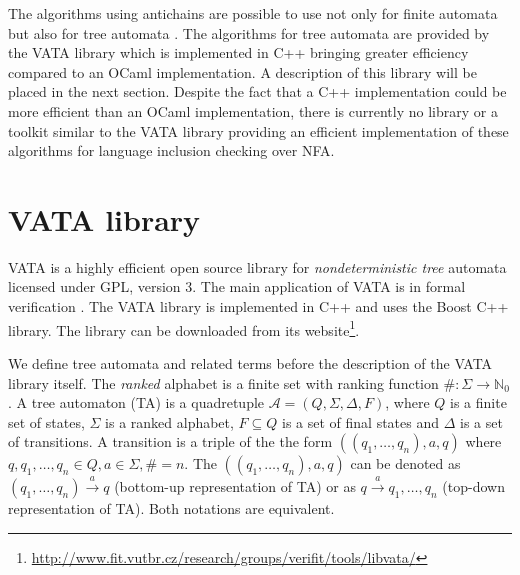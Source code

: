 The algorithms using antichains are possible to use not only for finite automata but also for tree automata \cite{cav06,tacas10}. 
The algorithms for tree automata are provided by the VATA library which is implemented in C++ bringing greater efficiency compared to an OCaml implementation. 
A description of this library will be placed in the next section.
Despite the fact that a C++ implementation could be more efficient than an OCaml implementation, there is currently 
no library or a toolkit similar to the VATA library providing an efficient implementation of these algorithms for language inclusion checking over NFA.

\section{VATA library}
\label{VATA}
VATA is a highly efficient open source library for \emph{nondeterministic tree} automata licensed under GPL, version 3. 
The main application of VATA is in formal verification \cite{libvata}.
The VATA library is implemented in C++ and uses the Boost C++ library. 
The library can be downloaded from its website\footnote{\url{http://www.fit.vutbr.cz/research/groups/verifit/tools/libvata/}}.  

We define tree automata and related terms before the description of the VATA library itself. The \emph{ranked} alphabet is a finite set with ranking function 
$\#:\Sigma\rightarrow \mathbb{N}_0$. A tree automaton (TA) is a quadretuple $\mathcal{A}=(Q,\Sigma,\Delta,F)$, where $Q$ is a finite set of states, $\Sigma$
is a ranked alphabet, $F\subseteq Q$ is a set of final states and $\Delta$ is a set of transitions. A transition is a triple of the the form
$((q_1,\ldots,q_n),a,q)$ where $q,q_1,\ldots,q_n \in Q, a\in \Sigma, \#=n$. The $((q_1,\ldots,q_n),a,q)$ can be denoted as $(q_1,\ldots,q_n)\xrightarrow{a}q$
(bottom-up representation of TA) or as $q\xrightarrow{a}q_1,\ldots,q_n$ (top-down representation of TA). Both notations are equivalent.

